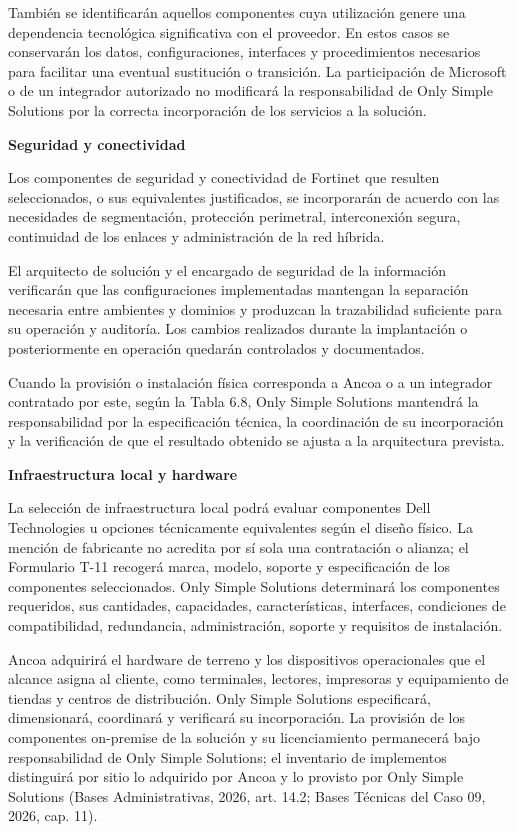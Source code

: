 \documentclass[11pt]{article}
\begin{document}
También se identificarán aquellos componentes cuya utilización genere
una dependencia tecnológica significativa con el proveedor. En estos
casos se conservarán los datos, configuraciones, interfaces y
procedimientos necesarios para facilitar una eventual sustitución o
transición. La participación de Microsoft o de un integrador autorizado
no modificará la responsabilidad de Only Simple Solutions por la
correcta incorporación de los servicios a la solución.

\textbf{Seguridad y conectividad}

Los componentes de seguridad y conectividad de Fortinet que resulten
seleccionados, o sus equivalentes justificados, se incorporarán de
acuerdo con las necesidades de segmentación, protección perimetral,
interconexión segura, continuidad de los enlaces y administración de la
red híbrida.

El arquitecto de solución y el encargado de seguridad de la información
verificarán que las configuraciones implementadas mantengan la
separación necesaria entre ambientes y dominios y produzcan la
trazabilidad suficiente para su operación y auditoría. Los cambios
realizados durante la implantación o posteriormente en operación
quedarán controlados y documentados.

Cuando la provisión o instalación física corresponda a Ancoa o a un integrador contratado por este, según la Tabla 6.8, Only Simple Solutions
mantendrá la responsabilidad por la especificación técnica, la
coordinación de su incorporación y la verificación de que el resultado
obtenido se ajusta a la arquitectura prevista.

\textbf{Infraestructura local y hardware}

La selección de infraestructura local podrá evaluar componentes Dell
Technologies u opciones técnicamente equivalentes según el diseño
físico. La mención de fabricante no acredita por sí sola una
contratación o alianza; el Formulario T-11 recogerá marca, modelo,
soporte y especificación de los componentes seleccionados. Only Simple
Solutions determinará los componentes requeridos, sus cantidades,
capacidades, características, interfaces, condiciones de compatibilidad,
redundancia, administración, soporte y requisitos de instalación.

Ancoa adquirirá el hardware de terreno y los dispositivos operacionales
que el alcance asigna al cliente, como terminales, lectores, impresoras
y equipamiento de tiendas y centros de distribución. Only Simple
Solutions especificará, dimensionará, coordinará y verificará su
incorporación. La provisión de los componentes on-premise de la solución
y su licenciamiento permanecerá bajo responsabilidad de Only Simple
Solutions; el inventario de implementos distinguirá por sitio lo
  adquirido por Ancoa y lo provisto por Only Simple Solutions (Bases
  Administrativas, 2026, art. 14.2; Bases Técnicas del Caso 09, 2026,
  cap. 11).
\end{document}
